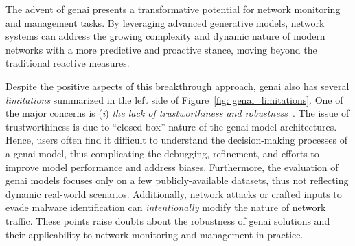 








The advent of \gls{genai} presents a transformative potential for network monitoring and management tasks. 
By leveraging advanced generative models, 
network systems can 
address the growing complexity and dynamic nature of modern networks with a more predictive and proactive stance, moving beyond the traditional reactive measures.

%
Despite the positive aspects of this breakthrough approach, \gls{genai} also has several \emph{limitations} summarized in the left side of Figure~\ref{fig: genai_limitations}. 
One of the major concerns is 
(\textit{i}) \emph{the lack of trustworthiness and robustness}~\cite{jacobs2022ai}.
The issue of trustworthiness is 
due to ``closed box'' nature of the \gls{genai}-model architectures.
Hence, users often find it difficult to 
understand the decision-making processes of a \gls{genai} model, thus complicating the debugging, refinement, and efforts to improve model performance and address biases.
Furthermore,
the evaluation of \gls{genai} models focuses only on a few publicly-available datasets, thus not reflecting dynamic real-world scenarios. 
Additionally, network attacks or crafted inputs to evade malware identification can \emph{intentionally} modify the nature of network traffic.
These points raise doubts about the robustness of \gls{genai} solutions and their applicability to network monitoring and management in practice.


